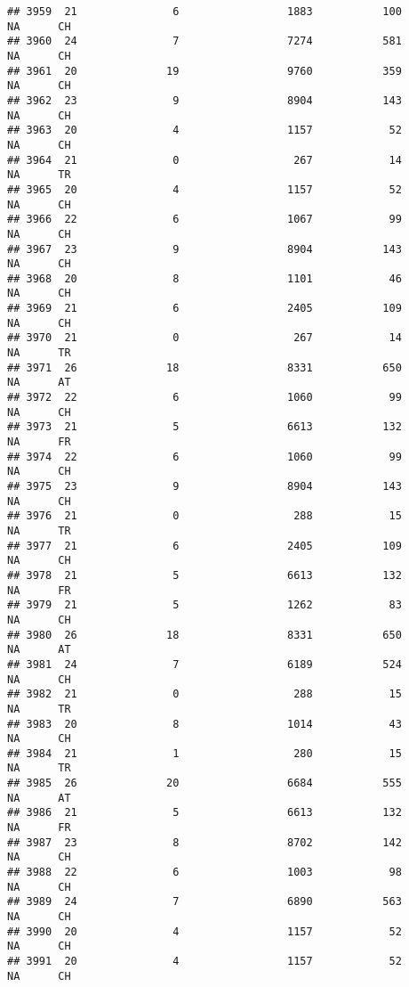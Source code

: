 \documentclass[
]{article}
\begin{document}
\begin{verbatim}
## 3959  21               6                 1883           100       NA      CH
## 3960  24               7                 7274           581       NA      CH
## 3961  20              19                 9760           359       NA      CH
## 3962  23               9                 8904           143       NA      CH
## 3963  20               4                 1157            52       NA      CH
## 3964  21               0                  267            14       NA      TR
## 3965  20               4                 1157            52       NA      CH
## 3966  22               6                 1067            99       NA      CH
## 3967  23               9                 8904           143       NA      CH
## 3968  20               8                 1101            46       NA      CH
## 3969  21               6                 2405           109       NA      CH
## 3970  21               0                  267            14       NA      TR
## 3971  26              18                 8331           650       NA      AT
## 3972  22               6                 1060            99       NA      CH
## 3973  21               5                 6613           132       NA      FR
## 3974  22               6                 1060            99       NA      CH
## 3975  23               9                 8904           143       NA      CH
## 3976  21               0                  288            15       NA      TR
## 3977  21               6                 2405           109       NA      CH
## 3978  21               5                 6613           132       NA      FR
## 3979  21               5                 1262            83       NA      CH
## 3980  26              18                 8331           650       NA      AT
## 3981  24               7                 6189           524       NA      CH
## 3982  21               0                  288            15       NA      TR
## 3983  20               8                 1014            43       NA      CH
## 3984  21               1                  280            15       NA      TR
## 3985  26              20                 6684           555       NA      AT
## 3986  21               5                 6613           132       NA      FR
## 3987  23               8                 8702           142       NA      CH
## 3988  22               6                 1003            98       NA      CH
## 3989  24               7                 6890           563       NA      CH
## 3990  20               4                 1157            52       NA      CH
## 3991  20               4                 1157            52       NA      CH

\end{verbatim}
\end{document}
